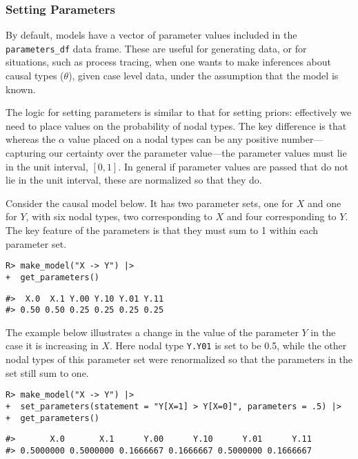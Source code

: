 \documentclass[
  11pt,
  article]{jss}
\begin{document}
\hypertarget{parameters}{%
\subsubsection{Setting Parameters}\label{parameters}}

By default, models have a vector of parameter values included in the
\texttt{parameters\_df} data frame. These are useful for generating
data, or for situations, such as process tracing, when one wants to make
inferences about causal types (\(\theta\)), given case level data, under
the assumption that the model is known.

The logic for setting parameters is similar to that for setting priors:
effectively we need to place values on the probability of nodal types.
The key difference is that whereas the \(\alpha\) value placed on a
nodal types can be any positive number---capturing our certainty over
the parameter value---the parameter values must lie in the unit
interval, \([0,1]\). In general if parameter values are passed that do
not lie in the unit interval, these are normalized so that they do.

Consider the causal model below. It has two parameter sets, one for
\(X\) and one for \(Y\), with six nodal types, two corresponding to
\(X\) and four corresponding to \(Y\). The key feature of the parameters
is that they must sum to 1 within each parameter set.

\begin{verbatim}
R> make_model("X -> Y") |> 
+  get_parameters()
\end{verbatim}

\begin{verbatim}
#>  X.0  X.1 Y.00 Y.10 Y.01 Y.11 
#> 0.50 0.50 0.25 0.25 0.25 0.25
\end{verbatim}

The example below illustrates a change in the value of the parameter
\(Y\) in the case it is increasing in \(X\). Here nodal type
\texttt{Y.Y01} is set to be 0.5, while the other nodal types of this
parameter set were renormalized so that the parameters in the set still
sum to one.

\begin{verbatim}
R> make_model("X -> Y") |>
+  set_parameters(statement = "Y[X=1] > Y[X=0]", parameters = .5) |>
+  get_parameters()
\end{verbatim}

\begin{verbatim}
#>       X.0       X.1      Y.00      Y.10      Y.01      Y.11 
#> 0.5000000 0.5000000 0.1666667 0.1666667 0.5000000 0.1666667
\end{verbatim}
\end{document}
